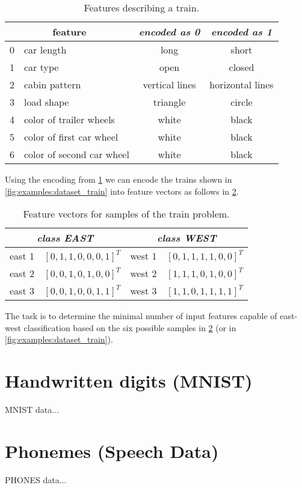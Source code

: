 \begin{table}[H]
\centering
\begin{tabular}{|c|l|c|c|}
\hline
\multicolumn{2}{|c|}{feature} & \textit{encoded as \textbf{0}} & \textit{encoded as \textbf{1}} \\ \hline \hline
0 & car length                & long                  & short                 \\ \hline
1 & car type                  & open                  & closed                \\ \hline
2 & cabin pattern             & vertical lines        & horizontal lines      \\ \hline
3 & load shape                & triangle              & circle                \\ \hline
4 & color of trailer wheels   & white                 & black                 \\ \hline
5 & color of first car wheel  & white                 & black                 \\ \hline
6 & color of second car wheel & white                 & black                 \\ \hline
\end{tabular}
\caption{Features describing a train.}
\label{tab:examples:train_features}
\end{table}

Using the encoding from \cref{tab:examples:train_features} we can encode the trains shown in \cref{fig:examples:dataset_train} into feature vectors as follows in \cref{tab:examples:train_feature_vectors}.

\begin{table}[H]
\centering
\begin{tabular}{|l|c|l|c|}
\hline
\multicolumn{2}{|c|}{\textit{class EAST}} & \multicolumn{2}{c|}{\textit{class WEST}} \\ \hline
east 1    & $ [0, 1, 1, 0, 0, 0, 1]^T $   & west 1   & $ [0, 1, 1, 1, 1, 0, 0]^T $   \\ \hline
east 2    & $ [0, 0, 1, 0, 1, 0, 0]^T $   & west 2   & $ [1, 1, 1, 0, 1, 0, 0]^T $   \\ \hline
east 3    & $ [0, 0, 1, 0, 0, 1, 1]^T $   & west 3   & $ [1, 1, 0, 1, 1, 1, 1]^T $   \\ \hline
\end{tabular}
\caption{Feature vectors for samples of the train problem.}
\label{tab:examples:train_feature_vectors}
\end{table}

The task is to determine the minimal number of input features capable of east-west classification based on the six possible samples in \cref{tab:examples:train_feature_vectors} (or in \cref{fig:examples:dataset_train}).



\section{Handwritten digits (MNIST)} \label{sec:dataset_mnist}
MNIST data... \citep{online:mnist}

\section{Phonemes (Speech Data)} \label{sec:dataset_phonemes}
PHONES data...
